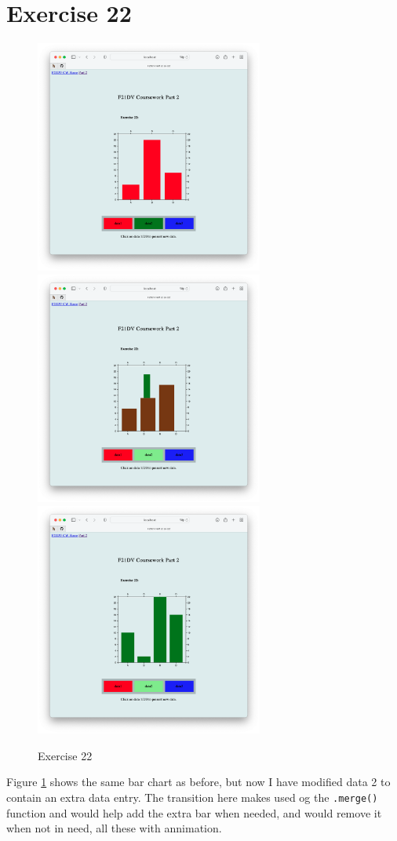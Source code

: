 \documentclass{scrreprt}
\begin{document}
\section{Exercise 22}
\begin{figure}[!ht]
    \centering
    \includegraphics[width = 7.5cm]{images/ex22_1.png}
    \includegraphics[width = 7.5cm]{images/ex22_2.png}
    \includegraphics[width = 7.5cm]{images/ex22_3.png}
    \label{fig:ex22}
    \caption{Exercise 22}
\end{figure}
\FloatBarrier
% 
Figure \ref{fig:ex22} shows the same bar chart as before, but now I have modified data 2 to contain an extra data entry. The transition here makes used og the \verb|.merge()| function and would help add the extra bar when needed, and would remove it when not in need, all these with annimation.
\end{document}

